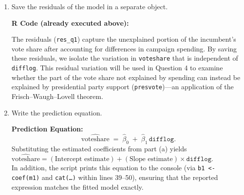 \documentclass[12pt,letterpaper]{article}
\begin{document}
\begin{enumerate}
		\vspace{0.3cm}
	\newpage	
		\item Save the residuals of the model in a separate object.
		
		 \noindent\textbf{R Code (already executed above):}
		
		
		\vspace{0.3cm}
		\noindent The residuals (\texttt{res\_q1}) capture the unexplained portion of the incumbent’s vote share after accounting for differences in campaign spending. 
		By saving these residuals, we isolate the variation in \texttt{voteshare} that is independent of \texttt{difflog}. 
		This residual variation will be used in Question 4 to examine whether the part of the vote share not explained by spending can instead be explained by presidential party support (\texttt{presvote})—an application of the Frisch–Waugh–Lovell theorem.
		
		\vspace{0.3cm}
		
		\item Write the prediction equation. \vspace{0.3cm}
		
		\noindent\textbf{Prediction Equation:}
		\[
		\widehat{\text{voteshare}} \;=\; \hat{\beta}_0 \;+\; \hat{\beta}_1\,\texttt{difflog}.
		\]
		Substituting the estimated coefficients from part (a) yields\\ 
		$\widehat{\text{voteshare}} = (\text{Intercept estimate}) + (\text{Slope estimate})\times\texttt{difflog}.$\\ 
		In addition, the script prints this equation to the console (via \texttt{b1 <- coef(m1)} and \texttt{cat(\ldots)} within lines 39–50), ensuring that the reported expression matches the fitted model exactly.
		
	\end{enumerate}
	
\newpage
\end{document}
